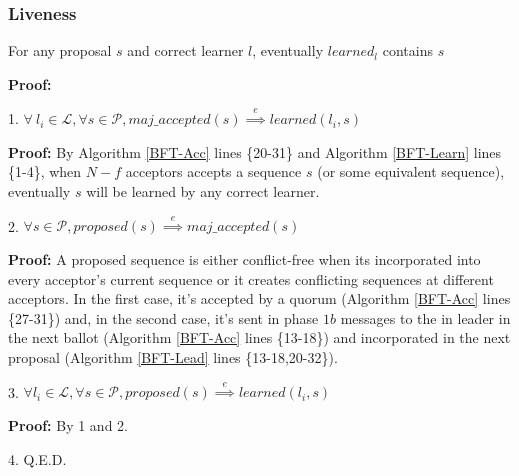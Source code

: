 \subsubsection{Liveness}
\begin{theorem}
For any proposal $s$ and correct learner $l$, eventually $learned_l$ contains $s$ \label{L-T1} \par
\end{theorem} 
\parbox{\linewidth}{\textbf{Proof:}} \par
\parbox{\linewidth}{\strut1. $\forall\ l_i \in \mathcal{L},\forall s \in \mathcal{P}, maj\_accepted(s) \overset{e}{\implies} learned(l_i,s)$}\par
\indent\indent\parbox{\linewidth}{\strut\textbf{Proof:} By Algorithm \ref{BFT-Acc} lines \{20-31\} and Algorithm \ref{BFT-Learn} lines \{1-4\}, when $N-f$ acceptors accepts a sequence $s$ (or some equivalent sequence), eventually $s$ will be learned by any correct learner.}\par
\parbox{\linewidth}{\strut2. $\forall s \in \mathcal{P}, proposed(s) \overset{e}{\implies} maj\_accepted(s)$} \par
\indent\indent\parbox{\linewidth}{\strut\textbf{Proof:} A proposed sequence is either conflict-free when its incorporated into every acceptor's current sequence or it creates conflicting sequences at different acceptors. In the first case, it's accepted by a quorum (Algorithm \ref{BFT-Acc} lines \{27-31\}) and, in the second case, it's sent in phase $1b$ messages to the in leader in the next ballot (Algorithm \ref{BFT-Acc} lines \{13-18\}) and incorporated in the next proposal (Algorithm \ref{BFT-Lead} lines \{13-18,20-32\}).} \par
\parbox{\linewidth}{\strut3. $\forall l_i \in \mathcal{L}, \forall s \in \mathcal{P}, proposed(s) \overset{e}{\implies} learned(l_i,s)$} \par
\indent\indent\parbox{\linewidth}{\strut\textbf{Proof:} By 1 and 2.} \par
\parbox{\linewidth}{\strut4. Q.E.D.}